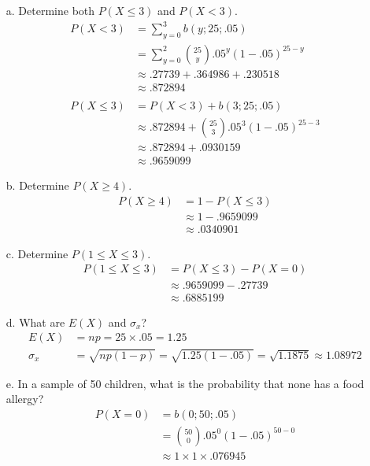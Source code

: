 \documentclass[letterpaper,12pt]{article}
\newcommand{\bp}[3]{%
  \binom{#2}{#1}#3^{#1}(1 - #3)^{#2 - #1}%
}
\begin{document}
\begin{enumerate}
    \begin{enumerate}
      \item[a.]
        Determine both $P(X \le 3)$ and $P(X < 3)$.
        \begin{align*}
          P(X < 3) &= \sum_{y = 0}^3 b(y; 25; .05) \\
          &= \sum_{y = 0}^2 \bp{y}{25}{.05} \\
          &\approx .27739 + .364986 + .230518 \\
          &\approx .872894 \\
          \\
          P(X \le 3) &= P(X < 3) + b(3; 25; .05) \\
          &\approx .872894 + \bp{3}{25}{.05} \\
          &\approx .872894 + .0930159 \\
          &\approx .9659099
        \end{align*}
      \item[b.]
        Determine $P(X \ge 4)$.
        \begin{align*}
          P(X \ge 4) &= 1 - P(X \le 3) \\
          &\approx 1 - .9659099 \\
          &\approx .0340901
        \end{align*}
      \item[c.]
        Determine $P(1 \le X \le 3)$.
        \begin{align*}
          P(1 \le X \le 3) &= P(X \le 3) - P(X = 0) \\
          &\approx .9659099 - .27739 \\
          &\approx .6885199
        \end{align*}
      \item[d.]
        What are $E(X)$ and $\sigma_x$?
        \begin{align*}
          E(X) &= np = 25 \times .05 = 1.25 \\
          \sigma_x &= \sqrt{np(1 - p)} = \sqrt{1.25(1 - .05)} = \sqrt{1.1875} \approx 1.08972
        \end{align*}
      \item[e.]
        In a sample of 50 children, what is the probability that none has a food allergy?
        \begin{align*}
          P(X = 0) &= b(0; 50; .05) \\\
          &= \bp{0}{50}{.05} \\
          &\approx 1 \times 1 \times .076945 \\

\end{align*}
\end{enumerate}
\end{enumerate}
\end{document}
